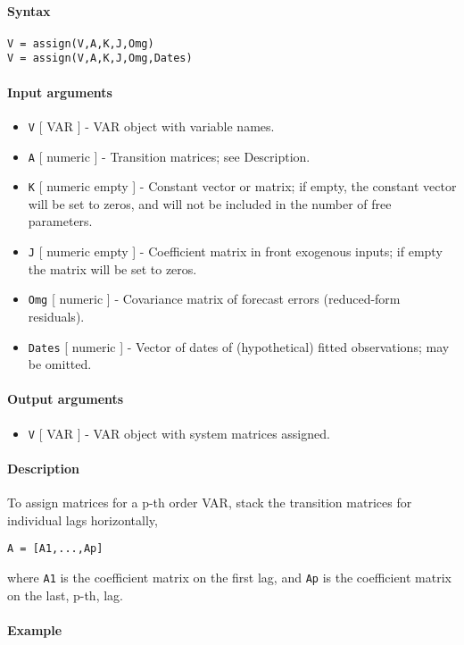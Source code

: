 


	\paragraph{Syntax}

\begin{verbatim}
V = assign(V,A,K,J,Omg)
V = assign(V,A,K,J,Omg,Dates)
\end{verbatim}

\paragraph{Input arguments}

\begin{itemize}
\item
  \texttt{V} {[} VAR {]} - VAR object with variable names.
\item
  \texttt{A} {[} numeric {]} - Transition matrices; see Description.
\item
  \texttt{K} {[} numeric \textbar{} empty {]} - Constant vector or
  matrix; if empty, the constant vector will be set to zeros, and will
  not be included in the number of free parameters.
\item
  \texttt{J} {[} numeric \textbar{} empty {]} - Coefficient matrix in
  front exogenous inputs; if empty the matrix will be set to zeros.
\item
  \texttt{Omg} {[} numeric {]} - Covariance matrix of forecast errors
  (reduced-form residuals).
\item
  \texttt{Dates} {[} numeric {]} - Vector of dates of (hypothetical)
  fitted observations; may be omitted.
\end{itemize}

\paragraph{Output arguments}

\begin{itemize}
\itemsep1pt\parskip0pt
\item
  \texttt{V} {[} VAR {]} - VAR object with system matrices assigned.
\end{itemize}

\paragraph{Description}

To assign matrices for a p-th order VAR, stack the transition matrices
for individual lags horizontally,

\begin{verbatim}
A = [A1,...,Ap]
\end{verbatim}

where \texttt{A1} is the coefficient matrix on the first lag, and
\texttt{Ap} is the coefficient matrix on the last, p-th, lag.

\paragraph{Example}


